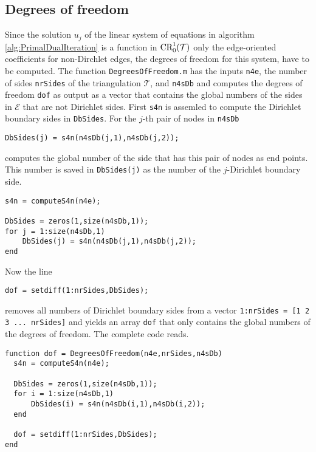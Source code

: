 \subsection{Degrees of freedom}
Since the solution $u_j$ of the linear system of equations in algorithm 
\ref{alg:PrimalDualIteration} is a function in $\textup{CR}^1_0(\mathcal T)$ 
only the edge-oriented coefficients for non-Dirchlet edges, the 
degrees of freedom for this system, have to be computed.
The function \texttt{DegreesOfFreedom.m} has the inputs 
\texttt{n4e}, the number of sides \texttt{nrSides} of the triangulation $\mathcal T$, and
\texttt{n4sDb} and computes the degrees of freedom \texttt{dof} as output as a vector
that contains the global numbers of the sides in $\mathcal E$ that are not Dirichlet sides.
First \texttt{s4n} is assemled to compute the Dirichlet boundary sides in \texttt{DbSides}.
For the $j$-th pair of nodes in \texttt{n4sDb} 
\begin{lstlisting}[frame=single,numbers=none]
DbSides(j) = s4n(n4sDb(j,1),n4sDb(j,2));
\end{lstlisting}
computes the global number of the side that has this pair of nodes as end points.
This number is saved in \texttt{DbSides(j)} as the number of the $j$-Dirichlet boundary
side.
\begin{lstlisting}[frame=single,numbers=none]
s4n = computeS4n(n4e);

DbSides = zeros(1,size(n4sDb,1));
for j = 1:size(n4sDb,1)
    DbSides(j) = s4n(n4sDb(j,1),n4sDb(j,2));
end
\end{lstlisting}
Now the line
\begin{lstlisting}[frame=single,numbers=none]
dof = setdiff(1:nrSides,DbSides);
\end{lstlisting}
removes all numbers of Dirichlet boundary sides from a vector 
\texttt{1:nrSides = [1 2 3 ... nrSides]} and yields an array \texttt{dof} that
only contains the
global numbers of the degrees of freedom.
The complete code reads.

\begin{lstlisting}[frame=single,numbers=none]
function dof = DegreesOfFreedom(n4e,nrSides,n4sDb)
  s4n = computeS4n(n4e);
  
  DbSides = zeros(1,size(n4sDb,1));
  for i = 1:size(n4sDb,1)
      DbSides(i) = s4n(n4sDb(i,1),n4sDb(i,2));
  end

  dof = setdiff(1:nrSides,DbSides);
end
\end{lstlisting}

